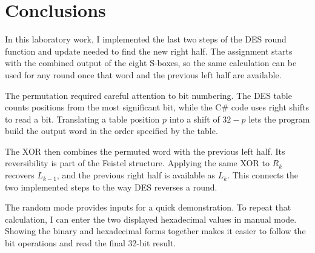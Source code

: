\chapter{Conclusions}
In this laboratory work, I implemented the last two steps of the DES
round function and update needed to find the new right half. The
assignment starts with the combined output of the eight S-boxes, so
the same calculation can be used for any round once that word and
the previous left half are available.

The permutation required careful attention to bit numbering. The DES
table counts positions from the most significant bit, while the C\#
code uses right shifts to read a bit. Translating a table position
$p$ into a shift of $32-p$ lets the program build the output word in
the order specified by the table.

The XOR then combines the permuted word with the previous left half.
Its reversibility is part of the Feistel structure. Applying the
same XOR to $R_k$ recovers $L_{k-1}$, and the previous right half is
available as $L_k$. This connects the two implemented steps to the
way DES reverses a round.

The random mode provides inputs for a quick demonstration. To repeat
that calculation, I can enter the two displayed hexadecimal values
in manual mode. Showing the binary and hexadecimal forms together
makes it easier to follow the bit operations and read the final
32-bit result.
